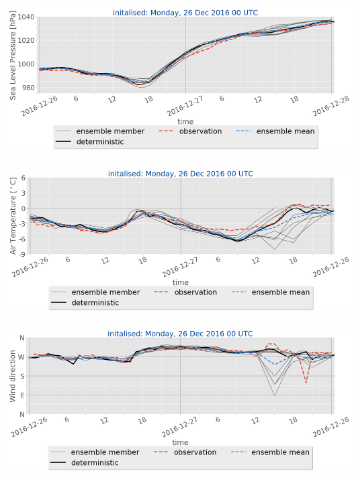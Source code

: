 \begin{figure}[H]\ContinuedFloat
	\centering
	\begin{subfigure}[b]{0.49\textwidth}
		\includegraphics[trim={0.cm 5.cm 0cm 0cm},clip,
		width=\textwidth]{./fig_sfc_pressure/20161226_00}
		\caption{}\label{fig:res:sfc_pres26}
	\end{subfigure}
	
	\begin{subfigure}[b]{0.49\textwidth}
		\includegraphics[trim={0.cm 5.cm 0cm 0cm},clip,
		width=\textwidth]{./fig_sfc_temp/20161226_00}
		\caption{}\label{fig:res:sfc_temp26}
	\end{subfigure}
	
	\begin{subfigure}[b]{0.49\textwidth}
		\includegraphics[trim={0.cm 5.cm 0cm 0cm},clip,
		width=\textwidth]{./fig_sfc_wd/20161226_00}
		\caption{}\label{fig:res:sfc_wd26}
	\end{subfigure}
	

\end{figure}

